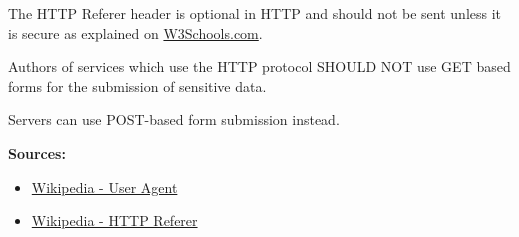 The HTTP Referer header is optional in HTTP and should not be sent unless
it is secure as explained on \href{https://www.w3.org/Protocols/rfc2616/rfc2616-sec15.html\#sec15.1.3}{W3Schools.com}.

Authors of services which use the HTTP protocol SHOULD NOT use GET based forms for the submission of sensitive data.

Servers can use POST-based form submission instead.

\textbf{Sources:}
\begin{itemize}
    \item \href{https://en.wikipedia.org/wiki/User\_agent}{Wikipedia - User Agent}
    \item \href{https://en.wikipedia.org/wiki/HTTP\_referer}{Wikipedia - HTTP Referer}
\end{itemize}
